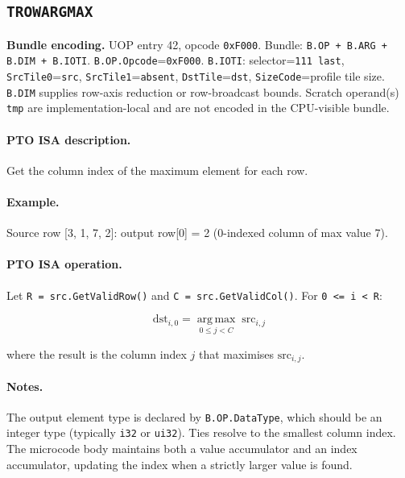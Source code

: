 \subsection{\texttt{TROWARGMAX}}
\noindent\textbf{Bundle encoding.} UOP entry 42, opcode \texttt{0xF000}. Bundle: \texttt{B.OP + B.ARG + B.DIM + B.IOTI}. \texttt{B.OP.Opcode}=\texttt{0xF000}. \texttt{B.IOTI}: selector=\texttt{111 last}, \texttt{SrcTile0}=\texttt{src}, \texttt{SrcTile1}=\texttt{absent}, \texttt{DstTile}=\texttt{dst}, \texttt{SizeCode}=profile tile size. \texttt{B.DIM} supplies row-axis reduction or row-broadcast bounds. Scratch operand(s) \texttt{tmp} are implementation-local and are not encoded in the CPU-visible bundle.\par\smallskip
{\small
\paragraph{PTO ISA description.}
Get the column index of the maximum element for each row.
\paragraph{Example.}
Source row [3, 1, 7, 2]: output row[0] = 2 (0-indexed column of max value 7).
\par\smallskip
\paragraph{PTO ISA operation.}
Let \texttt{R = src.GetValidRow()} and \texttt{C = src.GetValidCol()}. For \texttt{0 \textless{}= i \textless{} R}:

\[
\mathrm{dst}_{i,0} = \operatorname*{arg\,max}_{0 \le j < C}\; \mathrm{src}_{i,j}
\]

\noindent where the result is the column index $j$ that maximises $\mathrm{src}_{i,j}$.
}\par\smallskip
\paragraph{Notes.}
The output element type is declared by \texttt{B.OP.DataType}, which should be an integer type (typically \texttt{i32} or \texttt{ui32}). Ties resolve to the smallest column index. The microcode body maintains both a value accumulator and an index accumulator, updating the index when a strictly larger value is found.
